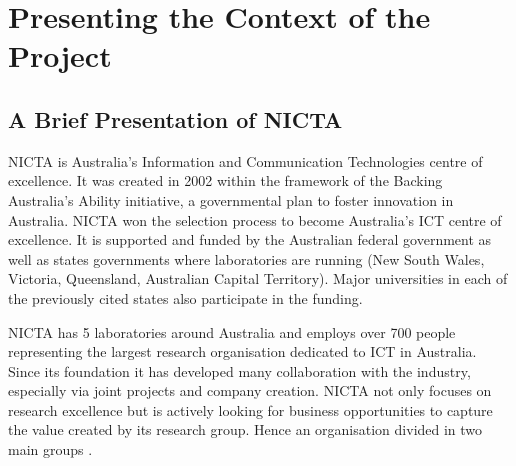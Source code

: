 \documentclass[10pt]{report}
\begin{document}
\newpage
\setcounter{tocdepth}{3} %
\tableofcontents
\newpage
{}
\setcounter{page}{1}
\pagestyle{fancy}
\renewcommand{\sectionmark}[1]{\markright{\thesection.\ #1}}
\fancyhead{}
\fancyhead[R]{\slshape \rightmark}
\fancyfoot{}
\fancyfoot[C]{\thepage}
\renewcommand{\headrulewidth}{0.4pt}
\renewcommand{\footrulewidth}{0 pt}

\renewcommand{\arraystretch}{1.5}
\setlength{\tabcolsep}{0.5cm}

\chapter{Presenting the Context of the Project}
\section{A Brief Presentation of NICTA}
NICTA is Australia's Information and Communication Technologies centre of excellence\footnotemark . It was created in 2002 within the framework of the Backing Australia's Ability initiative, a governmental plan to foster innovation in Australia. NICTA won the selection process to become Australia's ICT centre of excellence. It is supported and funded by the Australian federal government as well as states governments where laboratories are running (New South Wales, Victoria, Queensland, Australian Capital Territory). Major universities in each of the previously cited states also participate in the funding.


NICTA has 5 laboratories around Australia and employs over 700 people representing the largest research organisation dedicated to ICT in Australia. Since its foundation it has developed many collaboration with the industry, especially via joint projects and company creation. NICTA not only focuses on research excellence but is actively looking for business opportunities to capture the value created by its research group. Hence an organisation divided in two main groups \autocite{PresentationBooklet}.
\end{document}
